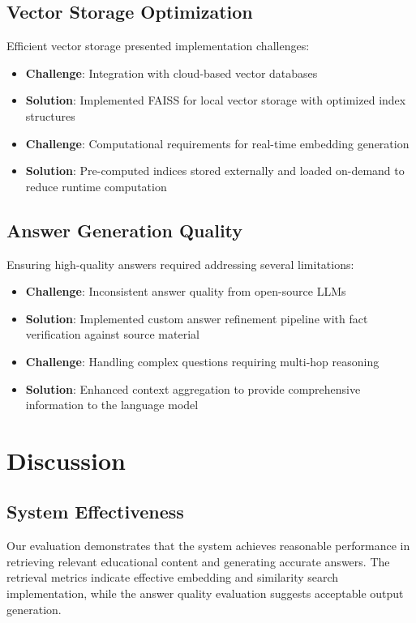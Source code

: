 \documentclass[10pt,conference]{IEEEtran}
\begin{document}
\subsection{Vector Storage Optimization}
Efficient vector storage presented implementation challenges:
\begin{itemize}
    \item \textbf{Challenge}: Integration with cloud-based vector databases
    \item \textbf{Solution}: Implemented FAISS for local vector storage with optimized index structures
    
    \item \textbf{Challenge}: Computational requirements for real-time embedding generation
    \item \textbf{Solution}: Pre-computed indices stored externally and loaded on-demand to reduce runtime computation
\end{itemize}

\subsection{Answer Generation Quality}
Ensuring high-quality answers required addressing several limitations:
\begin{itemize}
    \item \textbf{Challenge}: Inconsistent answer quality from open-source LLMs
    \item \textbf{Solution}: Implemented custom answer refinement pipeline with fact verification against source material
    
    \item \textbf{Challenge}: Handling complex questions requiring multi-hop reasoning
    \item \textbf{Solution}: Enhanced context aggregation to provide comprehensive information to the language model
\end{itemize}

\section{Discussion}
\subsection{System Effectiveness}
Our evaluation demonstrates that the system achieves reasonable performance in retrieving relevant educational content and generating accurate answers. The retrieval metrics indicate effective embedding and similarity search implementation, while the answer quality evaluation suggests acceptable output generation.
\end{document}

